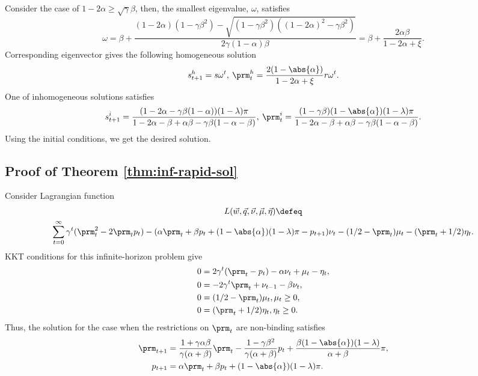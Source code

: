 Consider the case of $1 - 2 \alpha \ge \sqrt{\gamma} \beta$, then, the smallest
eigenvalue, $\omega$, satisfies
\[
    \omega = \beta + \frac{(1 - 2 \alpha) (1 - \gamma \beta^2) - \sqrt{(1 -
    \gamma \beta^2) ((1 - 2 \alpha)^2 - \gamma \beta^2)}}{2 \gamma (1 - \alpha)
    \beta} = \beta + \frac{2 \alpha \beta}{1 - 2 \alpha + \xi}.
\]
Corresponding eigenvector gives the following homogeneous solution
\[
    s^h_{t+1} = s \omega^t, \:
    \prm^h_t = \frac{2 (1 - \abs{\alpha})}{1 - 2 \alpha + \xi} r \omega^t.
\]
One of inhomogeneous solutions satisfies
\[
    s^i_{t+1} = \frac{(1 - 2 \alpha - \gamma \beta (1 - \alpha)) (1 - \lambda)
    \pi}{1 - 2 \alpha - \beta + \alpha \beta - \gamma \beta (1 - \alpha -
    \beta)}, \:
    \prm^i_t = \frac{(1 - \gamma \beta) (1 - \abs{\alpha}) (1 - \lambda) \pi}{1
    - 2 \alpha - \beta + \alpha \beta - \gamma \beta (1 - \alpha - \beta)}.
\]
Using the initial conditions, we get the desired solution.



\subsection{Proof of Theorem \ref{thm:inf-rapid-sol}}
\label{sec:proof-inf-rapid-sol}

Consider Lagrangian function
\begin{multline*}
    L(\vec{w}, \vec{q}, \vec{\nu}, \vec{\mu}, \vec{\eta}) \defeq\\
    \sum_{t=0}^\infty \gamma^t (\prm_t^2 - 2 \prm_t p_t) - (\alpha \prm_t + \beta p_t
    + (1 - \abs{\alpha}) (1 - \lambda) \pi - p_{t+1}) \nu_t - (1 / 2 - \prm_t)
    \mu_t - (\prm_t + 1 / 2) \eta_t.
\end{multline*}
KKT conditions for this infinite-horizon problem \citep[see Section 4.5
of][]{s89r} give
\[
    \begin{aligned}
        0 &= 2 \gamma^t (\prm_t - p_t) - \alpha \nu_t + \mu_t - \eta_t,\\
        0 &= -2 \gamma^t \prm_t + \nu_{t-1} - \beta \nu_t,\\
        0 &= (1 / 2 - \prm_t) \mu_t, \mu_t \ge 0,\\
        0 &= (\prm_t + 1 / 2) \eta_t, \eta_t \ge 0.
    \end{aligned}
\]
Thus, the solution for the case when the restrictions on $\prm_t$ are non-binding
satisfies
\[
    \begin{aligned}
        \prm_{t+1} &= \frac{1 + \gamma \alpha \beta}{\gamma (\alpha + \beta)} \prm_t
        - \frac{1 - \gamma \beta^2}{\gamma (\alpha + \beta)} p_t + \frac{\beta
        (1 - \abs{\alpha}) (1 - \lambda)}{\alpha + \beta} \pi,\\
        p_{t+1} &= \alpha \prm_t + \beta p_t + (1 - \abs{\alpha}) (1 - \lambda)
        \pi.
    \end{aligned}
\]

